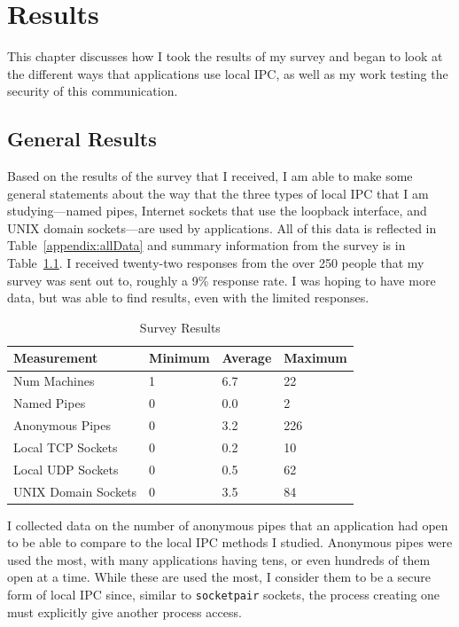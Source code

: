 \chapter{Results}
\label{sec:results}
This chapter discusses how I took the results of my survey and began to look at the different ways that applications use local IPC, as well as my work testing the security of this communication.

\section{General Results}
\label{sec:generalResults}
Based on the results of the survey that I received, I am able to make some general statements about the way that the three types of local IPC that I am studying---named pipes, Internet sockets that use the loopback interface, and UNIX domain sockets---are used by applications.  All of this data is reflected in Table~\ref{appendix:allData} and summary information from the survey is in Table~\ref{tab:surveyResults}.  I received twenty-two responses from the over 250 people that my survey was sent out to, roughly a 9\% response rate.  I was hoping to have more data, but was able to find results, even with the limited responses.

\begin{table}
\centering
\begin{small}
\begin{tabular}{ l | l | l | l }
\textbf{Measurement} & \textbf{Minimum} & \textbf{Average} & \textbf{Maximum} \\ \hline
Num Machines & 1 & 6.7 & 22 \\ \hline
Named Pipes & 0 & 0.0 & 2 \\ \hline
Anonymous Pipes & 0 & 3.2 & 226 \\ \hline
Local TCP Sockets & 0 & 0.2 & 10 \\ \hline
Local UDP Sockets & 0 & 0.5 & 62 \\ \hline
UNIX Domain Sockets & 0 & 3.5 & 84 \\ \hline
\end{tabular}
\caption{Survey Results}
\label{tab:surveyResults}
\end{small}
\end{table} 

I collected data on the number of anonymous pipes that an application had open to be able to compare to the local IPC methods I studied.  Anonymous pipes were used the most, with many applications having tens, or even hundreds of them open at a time.  While these are used the most, I consider them to be a secure form of local IPC since, similar to \texttt{socketpair} sockets, the process creating one must explicitly give another process access.

